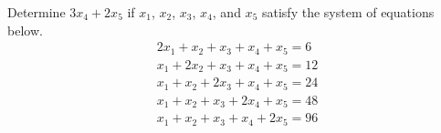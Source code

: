 Determine $3x_4+2x_5$ if $x_1$, $x_2$, $x_3$, $x_4$, and $x_5$ satisfy the system of equations below.
\[ \begin{array}{l} 2x_1+x_2+x_3+x_4+x_5=6 \\ x_1+2x_2+x_3+x_4+x_5=12 \\ x_1+x_2+2x_3+x_4+x_5=24 \\ x_1+x_2+x_3+2x_4+x_5=48 \\ x_1+x_2+x_3+x_4+2x_5=96 \\ \end{array}  \]